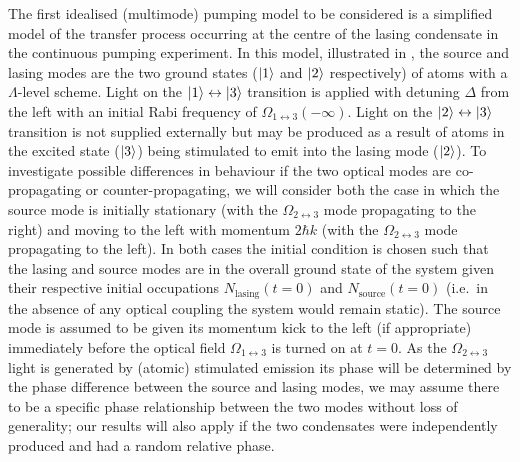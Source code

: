 The first idealised (multimode) pumping model to be considered is a simplified model of the transfer process occurring at the centre of the lasing condensate in the continuous pumping experiment.  In this model, illustrated in , the source and lasing modes are the two ground states (${\left|1\right>}$ and ${\left|2\right>}$ respectively) of atoms with a $\Lambda$-level scheme.  Light on the ${\left|1\right>} \leftrightarrow {\ensuremath{\left|3\right>}}$ transition is applied with detuning $\Delta$ from the left with an initial Rabi frequency of $\Omega_{1\leftrightarrow 3}(-\infty)$.  Light on the ${\left|2\right>} \leftrightarrow {\ensuremath{\left|3\right>}}$ transition is not supplied externally but may be produced as a result of atoms in the excited state (${\left|3\right>}$) being stimulated to emit into the lasing mode (${\left|2\right>}$).  To investigate possible differences in behaviour if the two optical modes are co-propagating or counter-propagating, we will consider both the case in which the source mode is initially stationary (with the $\Omega_{2\leftrightarrow 3}$ mode propagating to the right) and moving to the left with momentum $2 \hbar k$ (with the $\Omega_{2\leftrightarrow 3}$ mode propagating to the left).  In both cases the initial condition is chosen such that the lasing and source modes are in the overall ground state of the system given their respective initial occupations $N_\text{lasing}(t=0)$ and $N_\text{source}(t=0)$ (i.e.\ in the absence of any optical coupling the system would remain static).  The source mode is assumed to be given its momentum kick to the left (if appropriate) immediately before the optical field $\Omega_{1\leftrightarrow 3}$ is turned on at $t=0$.  As the $\Omega_{2\leftrightarrow 3}$ light is generated by (atomic) stimulated emission its phase will be determined by the phase difference between the source and lasing modes, we may assume there to be a specific phase relationship between the two modes without loss of generality; our results will also apply if the two condensates were independently produced and had a random relative phase.

